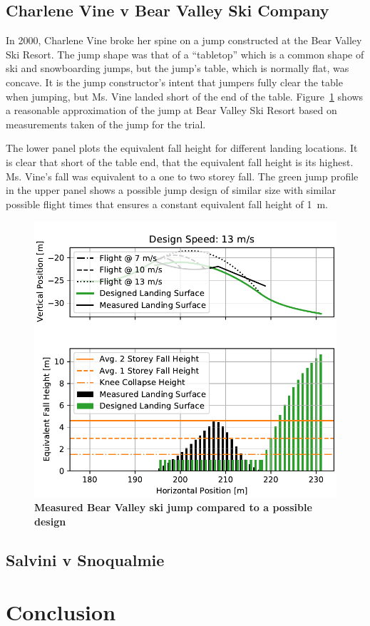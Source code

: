 \documentclass{article}
\begin{document}
\subsection{Charlene Vine v Bear Valley Ski Company}
%
In 2000, Charlene Vine broke her spine on a jump constructed at the Bear Valley
Ski Resort. The jump shape was that of a ``tabletop'' which is a common shape
of ski and snowboarding jumps, but the jump's table, which is normally flat,
was concave. It is the jump constructor's intent that jumpers fully clear the
table when jumping, but Ms. Vine landed short of the end of the table.
Figure~\ref{fig:vine-v-bear-valley} shows a reasonable approximation of the
jump at Bear Valley Ski Resort based on measurements taken of the jump for the
trial.

The lower panel plots the equivalent fall height for different landing
locations. It is clear that short of the table end, that the equivalent fall
height is its highest. Ms. Vine's fall was equivalent to a one to two storey
fall. The green jump profile in the upper panel shows a possible jump design of
similar size with similar possible flight times that ensures a constant
equivalent fall height of 1~\si{\meter}.
%
\begin{figure}
  \centering
  \includegraphics[width=5.25in]{figures/vine-v-bear-valley.pdf}
  \caption{\textbf{Measured Bear Valley ski jump compared to a possible design}\\

    }
  \label{fig:vine-v-bear-valley}
\end{figure}

\subsection{Salvini v Snoqualmie}

\section{Conclusion}
%


\end{document}
